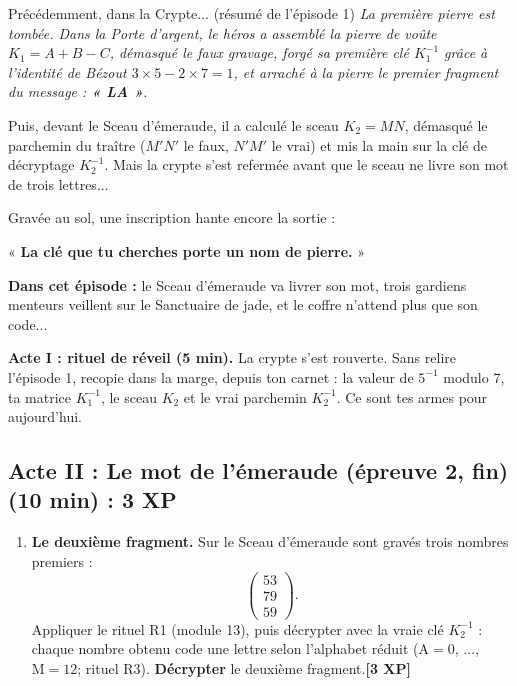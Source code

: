 \documentclass[11pt,a4paper]{article}
\newcommand{\Epx}[1]{\textcolor{or}{\textbf{[#1 XP]}}}
\begin{document}
	\begin{precedemment}{Précédemment, dans la Crypte... (résumé de l'épisode 1)}
		\itshape
		La première pierre est tombée. Dans la Porte d'argent, le héros a
		assemblé la pierre de voûte $K_1 = A + B - C$, démasqué le faux gravage,
		forgé sa première clé $K_1^{-1}$ grâce à l'identité de Bézout
		$3\times 5 - 2\times 7 = 1$, et arraché à la pierre le premier fragment
		du message : \textbf{« LA »}.
		
		Puis, devant le Sceau d'émeraude, il a calculé le sceau $K_2 = MN$,
		démasqué le parchemin du traître ($M'N'$ le faux, $N'M'$ le vrai) et mis
		la main sur la clé de décryptage $K_2^{-1}$. Mais la crypte s'est
		refermée avant que le sceau ne livre son mot de trois lettres...
		
		Gravée au sol, une inscription hante encore la sortie :
		\upshape
		\begin{center}
			« \textbf{La clé que tu cherches porte un nom de pierre.} »
		\end{center}
		\upshape
		
		\textbf{Dans cet épisode :} le Sceau d'émeraude va livrer son mot, trois
		gardiens menteurs veillent sur le Sanctuaire de jade, et le coffre
		n'attend plus que son code...
	\end{precedemment}
	
	\begin{conseil}
		\textbf{Acte I : rituel de réveil (5 min).} La crypte s'est rouverte.
		Sans relire l'épisode 1, recopie dans la marge, depuis ton carnet : la
		valeur de $5^{-1}$ modulo 7, ta matrice $K_1^{-1}$, le sceau $K_2$ et le
		vrai parchemin $K_2^{-1}$. Ce sont tes armes pour aujourd'hui.
	\end{conseil}
	
	\subsection*{\textcolor{emeraude}{Acte II : Le mot de l'émeraude (épreuve 2, fin)} \normalsize\textcolor{emeraude}{(10 min)} : 3 XP}
	
	\begin{enumerate}[label=\textbf{B.\arabic*.},leftmargin=10mm,start=3]
		\item \textbf{Le deuxième fragment.} Sur le Sceau d'émeraude sont gravés
		trois nombres premiers :
		\[
		\begin{pmatrix}53\\79\\59\end{pmatrix}.
		\]
		Appliquer le rituel R1 (module 13), puis décrypter avec la vraie clé
		$K_2^{-1}$ : chaque nombre obtenu code une lettre selon l'alphabet
		réduit ($\text{A}=0$, $\dots$, $\text{M}=12$; rituel R3).
		\textbf{Décrypter} le deuxième fragment.\Epx{3}
	\end{enumerate}
	
\end{document}
